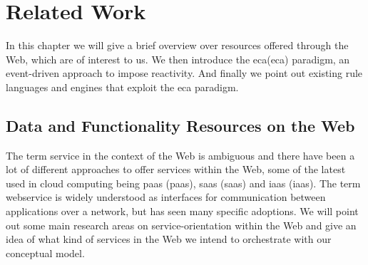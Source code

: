 
\chapter{Related Work}

In this chapter we will give a brief overview over resources offered through the Web, which are of interest to us.
We then introduce the \textrm{\acrlong{eca}(\acrshort{eca})} paradigm, an event-driven approach to impose reactivity.
And finally we point out existing rule languages and engines that exploit the \textrm{\acrshort{eca}} paradigm.

\section{Data and Functionality Resources on the Web}
The term service in the context of the Web is ambiguous and there have been a lot of different approaches to offer services within the Web, some of the latest used in cloud computing being \textrm{\acrlong{paas} (\acrshort{paas})}, \textrm{\acrlong{saas} (\acrshort{saas})} and \textrm{\acrlong{iaas} (\acrshort{iaas})}.
The term \textrm{\gls{webservice}} is widely understood as interfaces for communication between applications over a network, but has seen many specific adoptions.
We will point out some main research areas on service-orientation within the Web and give an idea of what kind of services in the Web we intend to orchestrate with our conceptual model.

